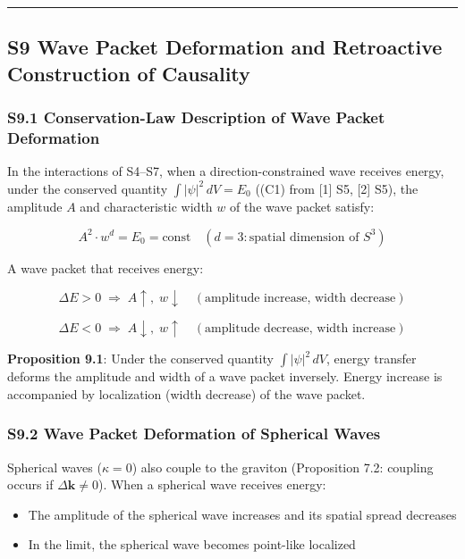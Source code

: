 \documentclass[
  a4paper,11pt]{article}
\providecommand{\tightlist}{%
  \setlength{\itemsep}{0pt}\setlength{\parskip}{0pt}}
\theoremstyle{definition}
\theoremstyle{remark}
\begin{document}
\begin{center}\rule{0.5\linewidth}{0.5pt}\end{center}

\subsection{S9 Wave Packet Deformation and Retroactive Construction of
Causality}\label{s9-wave-packet-deformation-and-retroactive-construction-of-causality}

\subsubsection{S9.1 Conservation-Law Description of Wave Packet
Deformation}\label{s9.1-conservation-law-description-of-wave-packet-deformation}

In the interactions of S4--S7, when a direction-constrained wave
receives energy, under the conserved quantity
\(\int |\psi|^2 \, dV = E_0\) ((C1) from {[}1{]} S5, {[}2{]} S5), the
amplitude \(A\) and characteristic width \(w\) of the wave packet
satisfy:

\[A^2 \cdot w^d = E_0 = \text{const} \quad (d = 3: \text{spatial dimension of } S^3)\]

A wave packet that receives energy:

\[\Delta E > 0 \;\Rightarrow\; A \uparrow,\; w \downarrow \quad (\text{amplitude increase, width decrease})\]

\[\Delta E < 0 \;\Rightarrow\; A \downarrow,\; w \uparrow \quad (\text{amplitude decrease, width increase})\]

\textbf{Proposition 9.1}: Under the conserved quantity
\(\int |\psi|^2 \, dV\), energy transfer deforms the amplitude and width
of a wave packet inversely. Energy increase is accompanied by
localization (width decrease) of the wave packet.

\subsubsection{S9.2 Wave Packet Deformation of Spherical
Waves}\label{s9.2-wave-packet-deformation-of-spherical-waves}

Spherical waves (\(\kappa = 0\)) also couple to the graviton
(Proposition 7.2: coupling occurs if \(\Delta\mathbf{k} \neq 0\)). When
a spherical wave receives energy:

\begin{itemize}
\tightlist
\item
  The amplitude of the spherical wave increases and its spatial spread
  decreases
\item
  In the limit, the spherical wave becomes point-like localized
\end{itemize}
\end{document}
